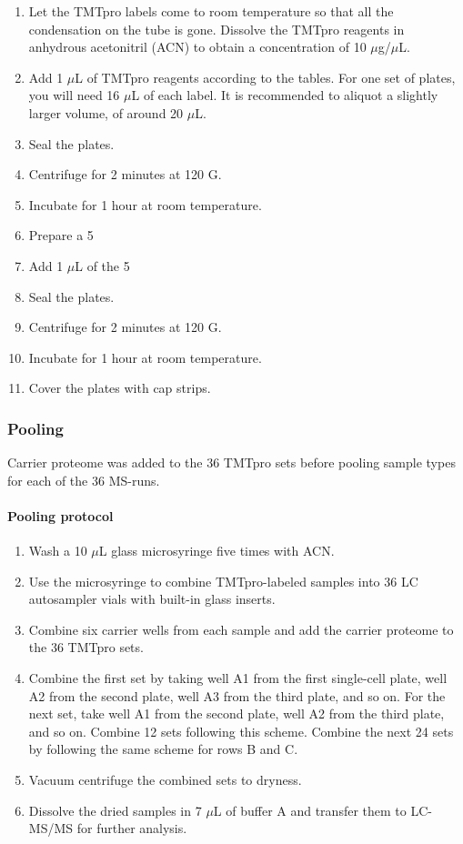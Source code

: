 \documentclass[
  11pt,
]{article}
\begin{document}
\begin{enumerate}
\item Let the TMTpro labels come to room temperature so that all the condensation on the tube is gone. Dissolve the TMTpro reagents in anhydrous acetonitril (ACN) to obtain a concentration of 10 $\mu$g/$\mu$L.
\item Add 1 $\mu$L of TMTpro reagents according to the tables. For one set of plates, you will need 16 $\mu$L of each label. It is recommended to aliquot a slightly larger volume, of around 20 $\mu$L.
\item Seal the plates.
\item Centrifuge for 2 minutes at 120 G.
\item Incubate for 1 hour at room temperature.
\item Prepare a 5%
\item Add 1 $\mu$L of the 5%
\item Seal the plates.
\item Centrifuge for 2 minutes at 120 G.
\item Incubate for 1 hour at room temperature.
\item Cover the plates with cap strips.
\end{enumerate}

\hypertarget{pooling}{%
\subsubsection{Pooling}\label{pooling}}

Carrier proteome was added to the 36 TMTpro sets before pooling sample types for each of the 36 MS-runs.

\hypertarget{pooling-protocol}{%
\paragraph{Pooling protocol}\label{pooling-protocol}}

\begin{enumerate}
\item Wash a 10 $\mu$L glass microsyringe five times with ACN.
\item Use the microsyringe to combine TMTpro-labeled samples into 36 LC autosampler vials with built-in glass inserts.
\item Combine six carrier wells from each sample and add the carrier proteome to the 36 TMTpro sets.
\item Combine the first set by taking well A1 from the first single-cell plate, well A2 from the second plate, well A3 from the third plate, and so on. For the next set, take well A1 from the second plate, well A2 from the third plate, and so on. Combine 12 sets following this scheme. Combine the next 24 sets by following the same scheme for rows B and C.
\item Vacuum centrifuge the combined sets to dryness.
\item Dissolve the dried samples in 7 $\mu$L of buffer A and transfer them to LC-MS/MS for further analysis.
\end{enumerate}
\end{document}
